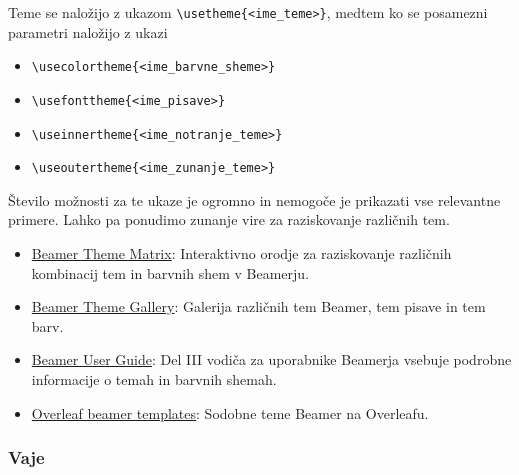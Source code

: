 Teme se naložijo z ukazom \texttt{{\textbackslash}usetheme\{\textless ime\_teme\textgreater \}}, medtem ko se posamezni parametri naložijo z ukazi

\begin{itemize}
\item \texttt{{\textbackslash}usecolortheme\{\textless ime\_barvne\_sheme\textgreater \}}
\item \texttt{{\textbackslash}usefonttheme\{\textless ime\_pisave\textgreater \}}
\item \texttt{{\textbackslash}useinnertheme\{\textless ime\_notranje\_teme\textgreater \}}
\item \texttt{{\textbackslash}useoutertheme\{\textless ime\_zunanje\_teme\textgreater \}}
\end{itemize}

Število možnosti za te ukaze je ogromno in nemogoče je prikazati vse relevantne primere.
Lahko pa ponudimo zunanje vire za raziskovanje različnih tem.

\begin{itemize}
\item \href{https://hartwork.org/beamer-theme-matrix/}{Beamer Theme Matrix}: Interaktivno orodje za raziskovanje različnih kombinacij tem in barvnih shem v Beamerju.
\item \href{https://deic.uab.es/~iblanes/beamer\_gallery/index.html}{Beamer Theme Gallery}: Galerija različnih tem Beamer, tem pisave in tem barv.
\item \href{https://tug.ctan.org/macros/latex/contrib/beamer/doc/beameruserguide.pdf}{Beamer User Guide}: Del III vodiča za uporabnike Beamerja vsebuje podrobne informacije o temah in barvnih shemah.
\item \href{https://www.overleaf.com/gallery/tagged/beamer}{Overleaf beamer templates}: Sodobne teme Beamer na Overleafu.
\end{itemize}

\subsubsection{Vaje}\label{06_latexBeamer_vaje}